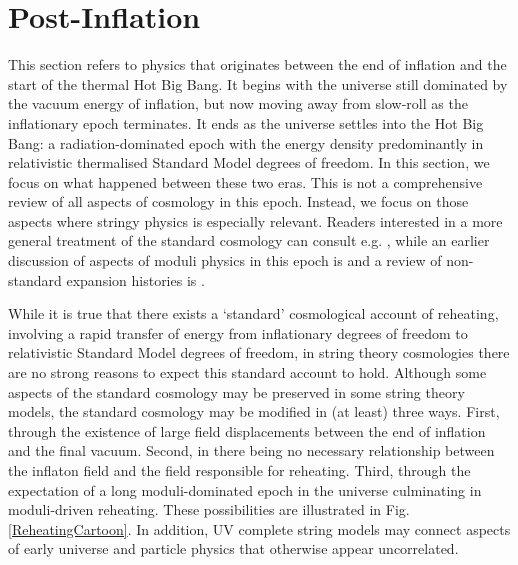 \newpage

\section{Post-Inflation}
\label{reheating}


This section refers to physics that originates between the end of inflation and the start of the thermal Hot Big Bang. It begins with the universe still dominated by the vacuum energy of inflation, but now moving away from slow-roll as the inflationary epoch terminates. It ends as the universe settles into the Hot Big Bang: a radiation-dominated epoch with the energy density predominantly in relativistic thermalised Standard Model degrees of freedom. In this section, we focus on what happened between these two eras. This is not a comprehensive review of all aspects of cosmology in this epoch. Instead, we focus on those aspects where stringy physics is especially relevant. Readers interested in a more general treatment of the standard cosmology can consult e.g. \cite{Kolb:1990vq, Baumann:2022mni}, while an earlier discussion of aspects of moduli physics in this epoch is \cite{150207746} and a review of non-standard expansion histories is \cite{Allahverdi:2020bys}.
 
 While it is true that there exists a `standard' cosmological account of reheating, involving a rapid transfer of energy from inflationary degrees of freedom to relativistic Standard Model degrees of freedom, in string theory cosmologies there are no strong reasons to expect this standard account to hold. Although some aspects of the standard cosmology may be preserved in some string theory models, the standard cosmology may be modified in (at least) three ways. First, through the existence of large field displacements between the end of inflation and the final vacuum. Second, in there being no necessary relationship between the inflaton field and the field responsible for reheating. Third, through the expectation of a long moduli-dominated epoch in the universe culminating in moduli-driven reheating. These possibilities are illustrated in Fig. \ref{ReheatingCartoon}. In addition, UV complete string models may connect aspects of early universe and particle physics that otherwise appear uncorrelated.
 
